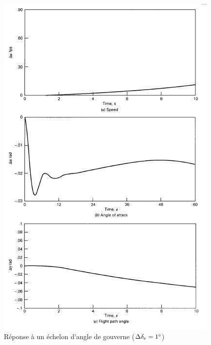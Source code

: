 \documentclass{report}
\begin{document}
\begin{figure}[h!]
    \centering
    \includegraphics[scale=0.6]{61.JPG}
    \caption{Réponse à un échelon d’angle de gouverne ($\Delta\delta_e=1\degree$)}
    \label{61}
\end{figure}
\end{document}
